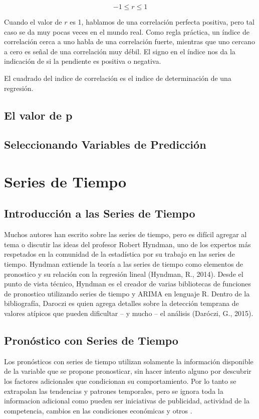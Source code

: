 \documentclass[letterpaper, spanish, 11pt]{report}
\begin{document}
\[ -1 \leq r \leq 1\]

Cuando el valor de $r$ es 1, hablamos de una correlación perfecta positiva, pero tal caso se da muy pocas veces en el mundo real. Como regla práctica, un índice de correlación cerca a uno habla de una correlación fuerte, mientras que uno cercano a cero es señal de una correlación muy débil. El signo en el índice nos da la indicación de si la pendiente es positiva o negativa.

El cuadrado del indice de correlación es el indice de determinación de una regresión.

\subsection{El valor de p}

\subsection{Seleccionando Variables de Predicción}

\section{Series de Tiempo}

\subsection{Introducción a las Series de Tiempo}
Muchos autores han escrito sobre las series de tiempo, pero es difícil agregar al tema o discutir las ideas del profesor Robert Hyndman, uno de los expertos más respetados en la comunidad de la estadística por su trabajo en las series de tiempo. Hyndman extiende la teoría a las series de tiempo como elementos de pronostico y su relación con la regresión lineal (Hyndman, R., 2014). Desde el punto de vista técnico, Hyndman es el creador de varias bibliotecas de funciones de pronostico utilizando series de tiempo y ARIMA en lenguaje R. Dentro de la bibliografía, Daroczi es quien agrega detalles sobre la detección temprana de valores atípicos que pueden dificultar – y mucho – el análisis (Daróczi, G., 2015).

\subsection{Pronóstico con Series de Tiempo}
Los pronósticos con series de tiempo utilizan solamente la información disponible de la variable que se propone pronosticar, sin hacer intento alguno por descubrir los factores adicionales que condicionan su comportamiento. Por lo tanto se extrapolan las tendencias y patrones temporales, pero se ignora toda la informacion adicional como pueden ser iniciativas de publicidad, actividad de la competencia, cambios en las condiciones económicas y otros \cite{hyndman}.
\end{document}
